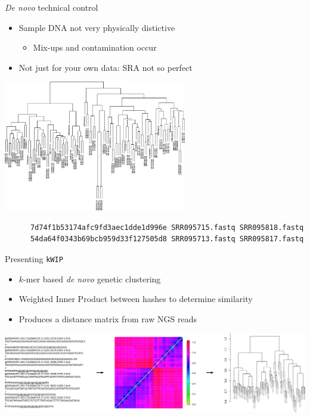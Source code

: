 \documentclass[t]{beamer}
\begin{document}
\begin{frame}[fragile]{\textit{De novo} technical control}
  \begin{itemize}
    \item Sample DNA not very physically distictive
      \begin{itemize}
        \item Mix-ups and contamination occur
      \end{itemize}
    \item Not just for your own data: SRA not so perfect
  \end{itemize}
  \begin{center}
    \includegraphics[width=0.6\textwidth]{img/at80-tree.png}
  \end{center}
  \pause
  \begingroup
    \fontsize{7pt}{7pt}\selectfont
    \begin{verbatim}
      7d74f1b53174afc9fd3aec1dde1d996e SRR095715.fastq SRR095818.fastq
      54da64f0343b69bcb959d33f127505d8 SRR095713.fastq SRR095817.fastq
    \end{verbatim}
  \endgroup
\end{frame}

\begin{frame}{Presenting \texttt{kWIP}}
  \begin{itemize}
    \item $k$-mer based \textit{de novo} genetic clustering
    \item Weighted Inner Product between hashes to determine similarity
    \item Produces a distance matrix from raw NGS reads
  \end{itemize}
  \begin{center}
    \includegraphics[width=\textwidth]{img/kwip-overview.png}
  \end{center}
\end{frame}
\end{document}
